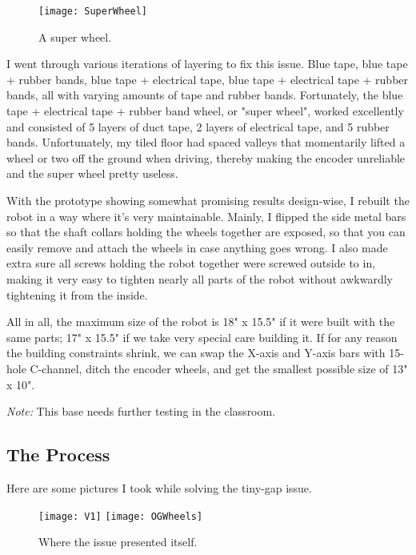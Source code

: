 \begin{figure}[h]
    \centering
    \texttt{[image: SuperWheel]}
    \caption{
        A super wheel.
    }
\end{figure}

I went through various iterations of layering to fix this issue. Blue tape, blue tape + rubber bands, blue tape + electrical tape, blue tape + electrical tape + rubber bands, all with varying amounts of tape and rubber bands. Fortunately, the blue tape + electrical tape + rubber band wheel, or "super wheel", worked excellently and consisted of 5 layers of duct tape, 2 layers of electrical tape, and 5 rubber bands. Unfortunately, my tiled floor had spaced valleys that momentarily lifted a wheel or two off the ground when driving, thereby making the encoder unreliable and the super wheel pretty useless.

With the prototype showing somewhat promising results design-wise, I rebuilt the robot in a way where it's very maintainable. Mainly, I flipped the side metal bars so that the shaft collars holding the wheels together are exposed, so that you can easily remove and attach the wheels in case anything goes wrong. I also made extra sure all screws holding the robot together were screwed outside to in, making it very easy to tighten nearly all parts of the robot without awkwardly tightening it from the inside.

All in all, the maximum size of the robot is 18" x 15.5" if it were built with the same parts; 17" x 15.5" if we take very special care building it. If for any reason the building constraints shrink, we can swap the X-axis and Y-axis bars with 15-hole C-channel, ditch the encoder wheels, and get the smallest possible size of 13" x 10".

\textit{Note:} This base needs further testing in the classroom.

\subsection{The Process}
Here are some pictures I took while solving the tiny-gap issue.

\begin{figure}[h]
    \centering
    \texttt{[image: V1]}
    \texttt{[image: OGWheels]}
    \caption{
        Where the issue presented itself.
    }
\end{figure}

